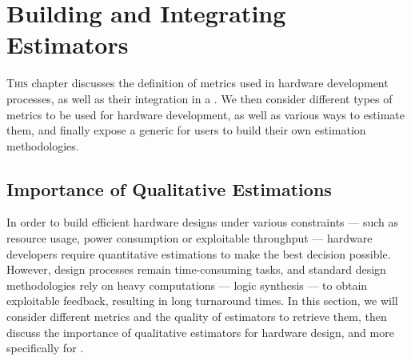 \chapter{Building and Integrating Estimators}


\lettrine[lines=2]{T}{his} chapter discusses the definition of metrics used in hardware development processes, as well as their integration in a .
We then consider different types of metrics to be used for hardware development, as well as various ways to estimate them, and finally expose a generic  for users to build their own estimation methodologies.

\vspace*{\fill}
\minitoc 
\mtcskip 

\newpage

\section{Importance of Qualitative Estimations}
\label{ch.estimators:sec.estimators}
    In order to build efficient hardware designs under various constraints --- such as resource usage, power consumption or exploitable throughput --- hardware developers require quantitative estimations to make the best decision possible.
    However, design processes remain time-consuming tasks, and standard design methodologies rely on heavy computations --- \eg logic synthesis --- to obtain exploitable feedback, resulting in long turnaround times.
    In this section, we will consider different metrics and the quality of estimators to retrieve them, then discuss the importance of qualitative estimators for hardware design, and more specifically for .

